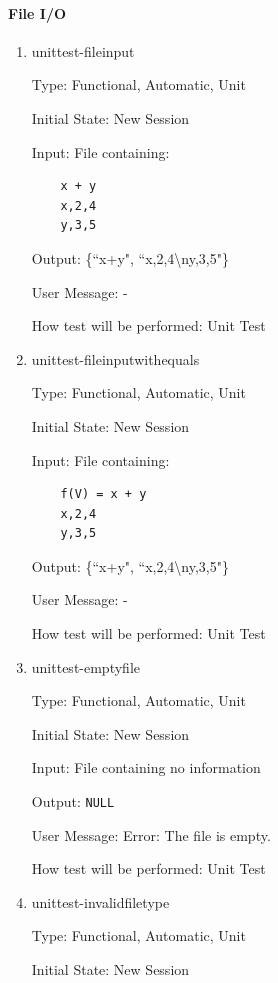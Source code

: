 \documentclass[12pt, titlepage]{article}
\begin{document}
\paragraph{File I/O}
\begin{enumerate}
	
	\item{unittest-fileinput}
	
	Type: Functional, Automatic, Unit
	
	Initial State: New Session
	
	Input: File containing:
	\begin{lstlisting}
	x + y
	x,2,4
	y,3,5
	\end{lstlisting}
	
	Output: \{``x+y", ``x,2,4\textbackslash ny,3,5"\}
	
	User Message: - 
	
	How test will be performed: Unit Test\\
	
	\item{unittest-fileinputwithequals}
	
	Type: Functional, Automatic, Unit
	
	Initial State: New Session
	
	Input: File containing:
	\begin{lstlisting}
	f(V) = x + y
	x,2,4
	y,3,5
	\end{lstlisting}
	
	Output: \{``x+y", ``x,2,4\textbackslash ny,3,5"\}
	
	User Message: - 
	
	How test will be performed: Unit Test\\
	
	\item{unittest-emptyfile}
	
	Type: Functional, Automatic, Unit
	
	Initial State: New Session
	
	Input: File containing no information
	
	Output: \texttt{NULL}
	
	User Message: Error: The file is empty.
	
	How test will be performed: Unit Test\\
	
	\item{unittest-invalidfiletype}
	
	Type: Functional, Automatic, Unit
	
	Initial State: New Session
	

\end{enumerate}
\end{document}
